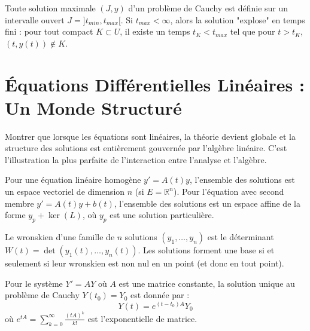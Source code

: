 \begin{theorem}
    Toute solution maximale $(J, y)$ d'un problème de Cauchy est définie sur un intervalle ouvert $J=]t_{min}, t_{max}[$. Si $t_{max} < \infty$, alors la solution "explose" en temps fini : pour tout compact $K \subset U$, il existe un temps $t_K < t_{max}$ tel que pour $t > t_K$, $(t, y(t)) \notin K$.
\end{theorem}

\section{Équations Différentielles Linéaires : Un Monde Structuré}

\begin{objectif}
    Montrer que lorsque les équations sont linéaires, la théorie devient globale et la structure des solutions est entièrement gouvernée par l'algèbre linéaire. C'est l'illustration la plus parfaite de l'interaction entre l'analyse et l'algèbre.
\end{objectif}

\begin{proposition}
    Pour une équation linéaire homogène $y' = A(t)y$, l'ensemble des solutions est un espace vectoriel de dimension $n$ (si $E=\mathbb{R}^n$).
    Pour l'équation avec second membre $y' = A(t)y + b(t)$, l'ensemble des solutions est un espace affine de la forme $y_p + \ker(L)$, où $y_p$ est une solution particulière.
\end{proposition}

\begin{definition}[Wronskien]
    Le wronskien d'une famille de $n$ solutions $(y_1, \dots, y_n)$ est le déterminant $W(t) = \det(y_1(t), \dots, y_n(t))$. Les solutions forment une base si et seulement si leur wronskien est non nul en un point (et donc en tout point).
\end{definition}

\begin{theorem}
    Pour le système $Y' = AY$ où $A$ est une matrice constante, la solution unique au problème de Cauchy $Y(t_0)=Y_0$ est donnée par :
    $$ Y(t) = e^{(t-t_0)A} Y_0 $$
    où $e^{tA} = \sum_{k=0}^\infty \frac{(tA)^k}{k!}$ est l'exponentielle de matrice.
\end{theorem}

